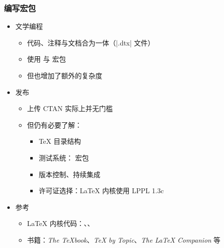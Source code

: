 \begin{frame}[fragile]
\frametitle{编写宏包}
\begin{itemize}
  \item<+-> 文学编程

    \begin{itemize}
      \item 代码、注释与文档合为一体（|.dtx| 文件）
      \item 使用  与  宏包
      \item 但也增加了额外的复杂度
    \end{itemize}

  \item<+-> 发布

    \begin{itemize}
      \item 上传 CTAN 实际上并无门槛
      \item 但仍有必要了解：

        \begin{itemize}
          \item \TeX{} 目录结构
          \item 测试系统： 宏包
          \item 版本控制、持续集成
          \item 许可证选择：\LaTeX{} 内核使用 LPPL 1.3c
        \end{itemize}
    \end{itemize}

  \item<+-> 参考

    \begin{itemize}
      \item \LaTeX{} 内核代码：、、
      \item 书籍：\textit{The \TeX book}、\textit{\TeX{} by Topic}、\textit{The \LaTeX{} Companion} 等
    \end{itemize}
\end{itemize}
\end{frame}

